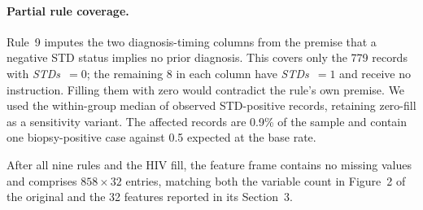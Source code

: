 \paragraph{Partial rule coverage.} Rule~9 imputes the two diagnosis-timing
columns from the premise that a negative STD status implies no prior diagnosis.
This covers only the 779 records with \emph{STDs}~$=0$; the remaining 8 in each
column have \emph{STDs}~$=1$ and receive no instruction. Filling them with zero
would contradict the rule's own premise. We used the within-group median of
observed STD-positive records, retaining zero-fill as a sensitivity variant.
The affected records are 0.9\% of the sample and contain one biopsy-positive
case against 0.5 expected at the base rate.

After all nine rules and the HIV fill, the feature frame contains no missing
values and comprises $858 \times 32$ entries, matching both the variable count
in Figure~2 of the original and the 32 features reported in its Section~3.

